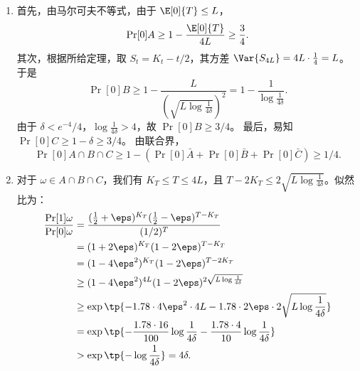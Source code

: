 \begin{solution}
    \begin{enumerate}
        \item 首先，由马尔可夫不等式，由于 $\E[0]{T} \le L$，
        \[
            \Pr[0]{A} \ge 1 - \frac{\E[0]{T}}{4L} \ge \frac{3}{4}.
        \]
        其次，根据所给定理，取 $S_t = K_t - t/2$，其方差 $\Var{S_{4L}} = 4L \cdot \frac{1}{4} = L$。于是
        \[
            \Pr[0]{B} \ge 1 - \frac{L}{( \sqrt{L \log \frac{1}{4\delta}} )^2} = 1 - \frac{1}{\log \frac{1}{4\delta}}.
        \]
        由于 $\delta < e^{-4}/4$，$\log \frac{1}{4\delta} > 4$，故 $\Pr[0]{B} \ge 3/4$。
        最后，易知 $\Pr[0]{C} \ge 1-\delta \ge 3/4$。
        由联合界，
        \[
            \Pr[0]{A \cap B \cap C} \ge 1 - (\Pr[0]{\bar A} + \Pr[0]{\bar B} + \Pr[0]{\bar C}) \ge 1/4.
        \]
        \item 对于 $\omega \in A \cap B \cap C$，我们有 $K_{T} \le T \le 4L$，且 $T - 2K_{T} \le 2\sqrt{L \log \frac{1}{4\delta}}$。似然比为：
        \begin{align*}
            \frac{\Pr[1]{\omega}}{\Pr[0]{\omega}} &= \frac{(\frac{1}{2}+\eps)^{K_T} (\frac{1}{2}-\eps)^{T-K_T}}{(1/2)^T} \\
            &= (1+2\eps)^{K_T} (1-2\eps)^{T-K_T} \\
             &= (1-4\eps^2)^{K_T} (1-2\eps)^{T-2K_T} \\
             &\ge (1-4\eps^2)^{4L} (1-2\eps)^{2\sqrt{L \log \frac{1}{4\delta}}} \\
             &\ge \exp\tp{-1.78 \cdot 4\eps^2 \cdot 4L - 1.78 \cdot 2\eps \cdot 2\sqrt{L \log \frac{1}{4\delta}}} \\
             &= \exp\tp{- \frac{1.78 \cdot 16}{100} \log \frac{1}{4\delta} - \frac{1.78 \cdot 4}{10} \log \frac{1}{4\delta}} \\
             &> \exp\tp{-\log \frac{1}{4\delta}} = 4\delta. 
        \end{align*}
        

\end{enumerate}
\end{solution}
